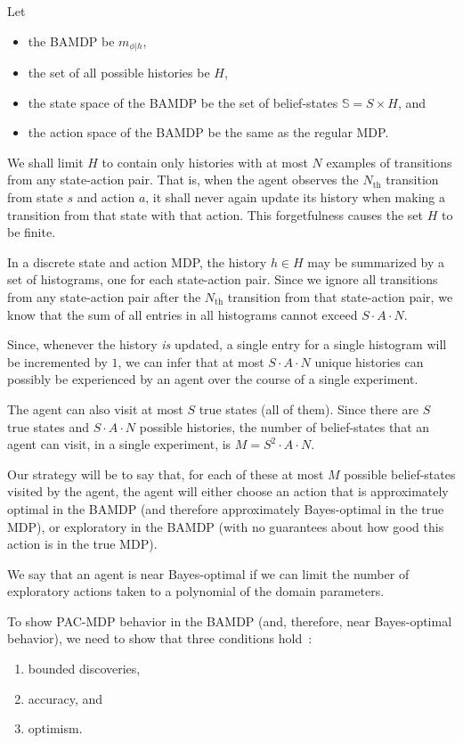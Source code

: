 Let
\begin{itemize}
\item the BAMDP be $m_{\phi|h}$,
\item the set of all possible histories be $H$,
\item the state space of the BAMDP be the set of belief-states $\mathbb{S} = S \times H$, and
\item the action space of the BAMDP be the same as the regular MDP.
\end{itemize}

We shall limit $H$ to contain only histories with at most $N$ examples of transitions from any state-action pair. That is, when the agent observes the $N_{\mbox{th}}$ transition from state $s$ and action $a$, it shall never again update its history when making a transition from that state with that action. This forgetfulness causes the set $H$ to be finite.

In a discrete state and action MDP, the history $h\in H$ may be summarized by a set of histograms, one for each state-action pair. Since we ignore all transitions from any state-action pair after the $N_{\mbox{th}}$ transition from that state-action pair, we know that the sum of all entries in all histograms cannot exceed $S\cdot A \cdot N$.

Since, whenever the history \emph{is} updated, a single entry for a single histogram will be incremented by $1$, we can infer that at most $S\cdot A \cdot N$ unique histories can possibly be experienced by an agent over the course of a single experiment.

The agent can also visit at most $S$ true states (all of them). Since there are $S$ true states and $S\cdot A \cdot N$ possible histories, the number of belief-states that an agent can visit, in a single experiment, is $M = S^2\cdot A \cdot N$.

Our strategy will be to say that, for each of these at most $M$ possible belief-states visited by the agent, the agent will either choose an action that is approximately optimal in the BAMDP (and therefore approximately Bayes-optimal in the true MDP), or exploratory in the BAMDP (with no guarantees about how good this action is in the true MDP).

We say that an agent is near Bayes-optimal if we can limit the number of exploratory actions taken to a polynomial of the domain parameters.

To show PAC-MDP behavior in the BAMDP (and, therefore, near Bayes-optimal behavior), we need to show that three conditions hold~\cite{lihong09abr2}:
\begin{enumerate}
\item \label{pacmdp-disc} bounded discoveries,
\item \label{pacmdp-acc} accuracy, and
\item \label{pacmdp-opt} optimism.
\end{enumerate}

